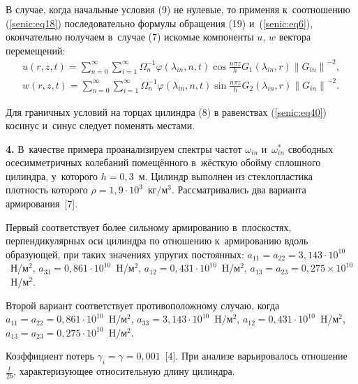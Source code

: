 В случае, когда начальные условия (9) не нулевые, то применяя к~соотношению 
(\ref{senic:eq18}) последовательно формулы обращения (19) и~(\ref{senic:eq6}), окончательно получаем 
в~случае (7) искомые компоненты $u$, $w$ вектора перемещений: 
\begin{equation}
 \begin{array}{l}
\displaystyle
 u\left( {r,z,t} \right) = \sum\limits_{n = 0}^\infty {\sum\limits_{i = 
1}^\infty {\Omega _n^{ - 1} } } \varphi \left( {\lambda _{in} ,n,t} 
\right)\cos \frac{n\pi z}{h}G_1 \left( {\lambda _{in} ,r} \right)\left\| 
{G_{in} } \right\|^{ - 2},\\
\displaystyle
w\left( {r,z,t} \right) = \sum\limits_{n = 0}^\infty {\sum\limits_{i = 
1}^\infty {\Omega _n^{ - 1} \varphi \left( {\lambda _{in} ,n,t} \right)\sin 
\frac{n\pi z}{h}G_2 } } \left( {\lambda _{in} ,r} \right)\left\| {G_{in} } 
\right\|^{ - 2}.
\end{array}\label{senic:eq40}
\end{equation}

Для граничных условий на торцах цилиндра (8) в равенствах (\ref{senic:eq40}) косинус 
и~синус следует поменять местами.

\textbf{4.} В~качестве примера проанализируем спектры частот $\omega _{in} $ 
и~$\omega _{in}^\ast $ свободных осесимметричных колебаний помещённого в~жёсткую 
обойму сплошного цилиндра, у~которого $h = 0{,}3$~м. 
Цилиндр выполнен из стеклопластика плотность которого $\rho =1{,}9\cdot 10^{3}$~кг/м$^{3}$. 
Рассматривались два варианта армирования~[7]. 

Первый соответствует более сильному армированию в~плоскостях, 
перпендикулярных оси цилиндра по отношению к~армированию вдоль образующей, 
при таких значениях упругих постоянных: 
$a_{11}=a_{22}=3{,}143\cdot10^{10}$~Н/м$^{2}$, 
$a_{33}=0{,}861\cdot 10^{10}$~H/м$^{2}$, 
$a_{12}=0{,}431\cdot 10^{10}$~H/м$^{2}$, 
$a_{13}=a_{23}=0{,}275\times 10^{10 }$~H/м$^{2}$.

Второй вариант соответствует противоположному случаю, 
когда 
$a_{11}=a_{22}=0{,}861\cdot 10^{10}$~H/м$^{2}$, 
$a_{33}=3{,}143\cdot 10^{10}$~H/м$^{2}$, 
$a_{12}=0{,}431\cdot 10^{10}$~H/м$^{2}$, 
$a_{13}=a_{23}=0{,}275\cdot 10^{10 }$~H/м$^{2}$.

Коэффициент потерь $\gamma _i = \gamma = 0{,}001$~[4]. При анализе 
варьировалось отношение $\frac{l}{2b}$, характеризующее относительную длину 
цилиндра.



